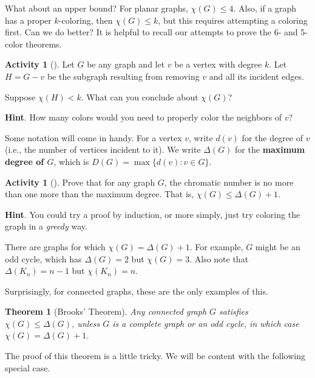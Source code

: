 \documentclass[10pt,]{book}
\newcommand{\terminology}[1]{\textbf{#1}}
\theoremstyle{plain}
\newtheorem{theorem}{Theorem}[section]
\theoremstyle{definition}
\theoremstyle{definition}
\theoremstyle{definition}
\newtheorem{activity}[project]{Activity}
\numberwithin{equation}{chapter}
\def\st{:}
\newcommand{\lt}{<}
\begin{document}
\par
\hypertarget{p-385}{}%
What about an upper bound?  For planar graphs, \(\chi(G) \le 4\).  Also, if a graph has a proper \(k\)-coloring, then \(\chi(G) \le k\), but this requires attempting a coloring first.  Can we do better? It is helpful to recall our attempts to prove the 6- and 5-color theorems.%
\begin{activity}[]\label{activity-37}
\hypertarget{p-386}{}%
Let \(G\) be any graph and let \(v\) be a vertex with degree \(k\).  Let \(H = G - v\) be the subgraph resulting from removing \(v\) and all its incident edges.%
\par
\hypertarget{p-387}{}%
Suppose \(\chi(H) \lt k\).  What can you conclude about \(\chi(G)\)?%
\par\smallskip%
\noindent\textbf{Hint}.\hypertarget{hint-18}{}\quad%
\hypertarget{p-388}{}%
How many colors would you need to properly color the neighbors of \(v\)?%
\end{activity}
\hypertarget{p-389}{}%
Some notation will come in handy.  For a vertex \(v\), write \(d(v)\) for the degree of \(v\) (i.e., the number of vertices incident to it).  We write \(\Delta(G)\) for the \terminology{maximum degree of \(G\)}, which is \(D(G) = \max\{d(v) \st v \in G\}\).%
\begin{activity}[]\label{activity-38}
\hypertarget{p-390}{}%
Prove that for any graph \(G\), the chromatic number is no more than one more than the maximum degree.  That is, \(\chi(G) \le \Delta(G) + 1\).%
\par\smallskip%
\noindent\textbf{Hint}.\hypertarget{hint-19}{}\quad%
\hypertarget{p-391}{}%
You could try a proof by induction, or more simply, just try coloring the graph in a \emph{greedy} way.%
\end{activity}
\hypertarget{p-392}{}%
There are graphs for which \(\chi(G) = \Delta(G) + 1\).  For example, \(G\) might be an odd cycle, which has \(\Delta(G) = 2\) but \(\chi(G) = 3\).  Also note that \(\Delta(K_n) = n-1\) but \(\chi(K_n) = n\).%
\par
\hypertarget{p-393}{}%
Surprisingly, for connected graphs, these are the only examples of this.%
\begin{theorem}[{Brooks' Theorem}]\label{theorem-6}
\hypertarget{p-394}{}%
 Any connected graph \(G\) satisfies \(\chi(G) \le \Delta(G)\), unless \(G\) is a complete graph or an odd cycle, in which case \(\chi(G) = \Delta(G) + 1\).%
\end{theorem}
\hypertarget{p-395}{}%
The proof of this theorem is a little tricky.  We will be content with the following special case.%
\end{document}
